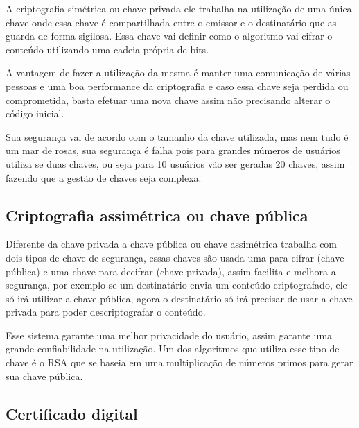\par A criptografia simétrica ou chave privada ele trabalha na utilização de uma única chave onde essa chave é compartilhada entre o emissor e o destinatário que as guarda de forma sigilosa. Essa chave vai definir como o algoritmo vai cifrar o conteúdo utilizando uma cadeia própria de bits.

\par A vantagem de fazer a utilização da mesma é manter uma comunicação de várias pessoas e uma boa performance da criptografia e caso essa chave seja perdida ou comprometida, basta efetuar uma nova chave assim não precisando alterar o código inicial.

\par Sua segurança vai de acordo com o tamanho da chave utilizada, mas nem tudo é um mar de rosas, sua segurança é falha pois para grandes números de usuários utiliza se duas chaves, ou seja para 10 usuários vão ser geradas 20 chaves, assim fazendo que a gestão de chaves seja complexa.

\subsection{\textbf{Criptografia assimétrica ou chave pública}}

\par Diferente da chave privada a chave pública ou chave assimétrica trabalha com dois tipos de chave de segurança, essas chaves são usada uma para cifrar (chave pública) e uma chave para decifrar (chave privada), assim facilita e melhora a segurança, por exemplo se um destinatário envia um conteúdo criptografado, ele só irá utilizar a chave pública, agora o destinatário só irá precisar de usar a chave privada para poder descriptografar o conteúdo.

\par Esse sistema garante uma melhor privacidade do usuário, assim garante uma grande confiabilidade na utilização. Um dos algoritmos que utiliza esse tipo de chave é o RSA que se baseia em uma multiplicação de números primos para gerar sua chave pública.

\newpage
\subsection{\textbf{Certificado digital}}

